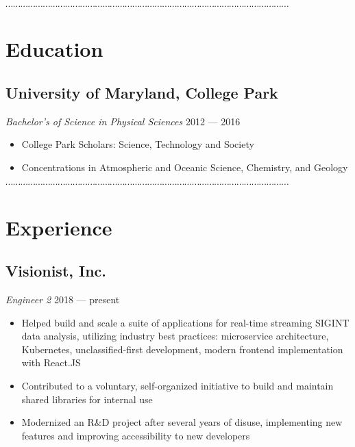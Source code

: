 \documentclass[10pt]{article}
\newcommand{\dotfringe}{
    \begin{center}
      $\cdots\cdots\cdots\cdots\cdots\cdots\cdots\cdots\cdots\cdots\cdots\cdots\cdots\cdots\cdots\cdots\cdots\cdots\cdots\cdots\cdots\cdots\cdots\cdots\cdots\cdots\cdots\cdots\cdots\cdots\cdots\cdots\cdots\cdots\cdots\cdots\cdots\cdots$
    \end{center}
}
\begin{document}

\dotfringe{}

\section*{Education}
\subsection*{University of Maryland, College Park}
\textit{Bachelor's of Science in Physical Sciences} \hfill 2012 --- 2016
\begin{itemize}
  \item College Park Scholars: Science, Technology and Society
  \item Concentrations in Atmospheric and Oceanic Science, Chemistry, and Geology
\end{itemize}

\dotfringe{}

\section*{Experience}
\subsection*{Visionist, Inc.}
\textit{Engineer 2} \hfill 2018 --- present
\begin{itemize}
  \item Helped build and scale a suite of applications for real-time
    streaming SIGINT data analysis, utilizing industry best practices: microservice
    architecture, Kubernetes, unclassified-first development, modern frontend
    implementation with React.JS
  \item Contributed to a voluntary, self-organized initiative to build and maintain
    shared libraries for internal use
  \item Modernized an R\&D project after several years of disuse, implementing
    new features and improving accessibility to new developers
\end{itemize}
\end{document}
